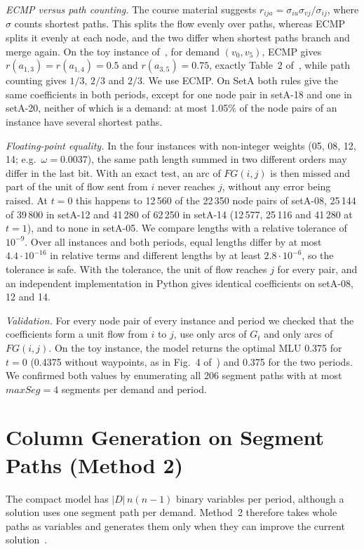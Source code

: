 \documentclass[conference]{IEEEtran}
\begin{document}
\emph{ECMP versus path counting.} The course material suggests $r_{ija}=\sigma_{iu}\sigma_{vj}/\sigma_{ij}$, where $\sigma$ counts shortest paths. This splits the flow evenly over paths, whereas ECMP splits it evenly at each node, and the two differ when shortest paths branch and merge again. On the toy instance of~\cite{subject}, for demand $(v_0,v_5)$, ECMP gives $r(a_{1,3})=r(a_{1,4})=0.5$ and $r(a_{3,5})=0.75$, exactly Table~2 of~\cite{subject}, while path counting gives $1/3$, $2/3$ and $2/3$. We use ECMP. On SetA both rules give the same coefficients in both periods, except for one node pair in setA-18 and one in setA-20, neither of which is a demand: at most 1.05\% of the node pairs of an instance have several shortest paths.

\emph{Floating-point equality.} In the four instances with non-integer weights (05, 08, 12, 14; e.g.\ $\omega=0.0037$), the same path length summed in two different orders may differ in the last bit. With an exact test, an arc of $FG(i,j)$ is then missed and part of the unit of flow sent from $i$ never reaches $j$, without any error being raised. At $t=0$ this happens to 12\,560 of the 22\,350 node pairs of setA-08, 25\,144 of 39\,800 in setA-12 and 41\,280 of 62\,250 in setA-14 (12\,577, 25\,116 and 41\,280 at $t=1$), and to none in setA-05. We compare lengths with a relative tolerance of $10^{-9}$. Over all instances and both periods, equal lengths differ by at most $4.4\cdot10^{-16}$ in relative terms and different lengths by at least $2.8\cdot10^{-6}$, so the tolerance is safe. With the tolerance, the unit of flow reaches $j$ for every pair, and an independent implementation in Python gives identical coefficients on setA-08, 12 and 14.

\emph{Validation.} For every node pair of every instance and period we checked that the coefficients form a unit flow from $i$ to $j$, use only arcs of $G_t$ and only arcs of $FG(i,j)$. On the toy instance, the model returns the optimal MLU 0.375 for $t=0$ (0.4375 without waypoints, as in Fig.~4 of~\cite{subject}) and 0.375 for the two periods. We confirmed both values by enumerating all 206 segment paths with at most $maxSeg=4$ segments per demand and period.

\section{Column Generation on Segment Paths (Method 2)}\label{sec:cg}

The compact model has $|D|\,n(n-1)$ binary variables per period, although a solution uses one segment path per demand. Method~2 therefore takes whole paths as variables and generates them only when they can improve the current solution~\cite{cg4sr,jaumard2026}.
\end{document}
